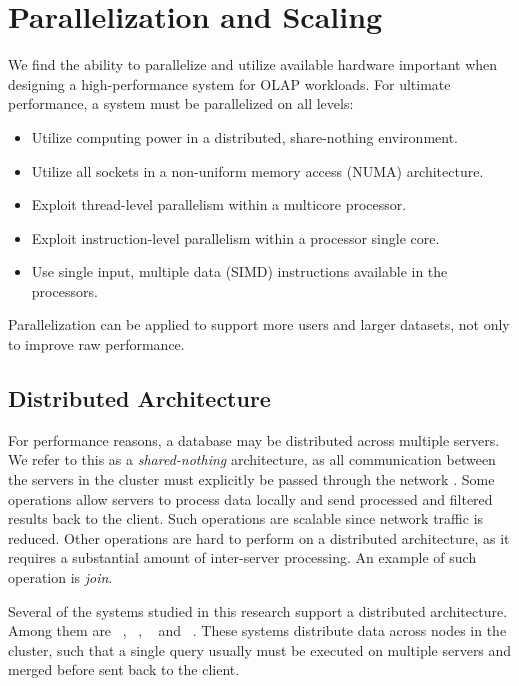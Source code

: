 \chapter{Parallelization and Scaling}
\label{chap:Parallelization and Scaling}
We find the ability to parallelize and utilize available hardware important when designing a high-performance system for OLAP workloads. For ultimate performance, a system must be parallelized on all levels:

\begin{itemize}
  \item Utilize computing power in a distributed, share-nothing environment.
  \item Utilize all sockets in a non-uniform memory access (NUMA) architecture.
  \item Exploit thread-level parallelism within a multicore processor.
  \item Exploit instruction-level parallelism within a processor single core.
  \item Use single input, multiple data (SIMD) instructions available in the processors.
\end{itemize}

Parallelization can be applied to support more users and larger datasets, not only to improve raw performance.

\newpage

\section{Distributed Architecture}
\label{sec:Distributed Architecture}
For performance reasons, a database may be distributed across multiple servers. We refer to this as a \textit{shared-nothing} architecture, as all communication between the servers in the cluster must explicitly be passed through the network \cite{DeWitt1992-ki}. Some operations allow servers to process data locally and send processed and filtered results back to the client. Such operations are scalable since network traffic is reduced. Other operations are hard to perform on a distributed architecture, as it requires a substantial amount of inter-server processing. An example of such operation is \textit{join}.


Several of the systems studied in this research support a distributed architecture. Among them are \oracle~\cite{Mukherjee2015-ul}, \cstore~\cite{Stonebraker2005-qz}, \saph~\cite{Farber2012-vh} and \exasol~\cite{Exasol2014-xh}. These systems distribute data across nodes in the cluster, such that a single query usually must be executed on multiple servers and merged before sent back to the client.

